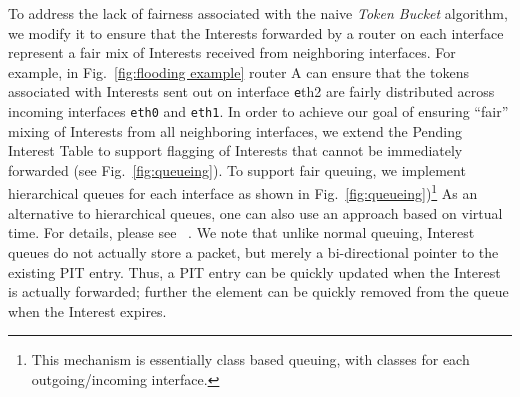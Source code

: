 

To address the lack of fairness associated with the naive {\it Token Bucket} algorithm, we modify it to ensure that the Interests forwarded by a router on each interface represent a fair mix of Interests received from neighboring interfaces. For example, in Fig.~\ref{fig:flooding example} router A can ensure that the tokens associated with Interests sent out on interface {\texttt eth2}  are fairly distributed across incoming interfaces \texttt{eth0} and \texttt{eth1}. 
In order to achieve our goal of ensuring ``fair'' mixing of Interests from all neighboring interfaces, 
we extend the Pending Interest Table to support flagging of Interests that cannot be immediately forwarded (see Fig.~\ref{fig:queueing}). To support fair queuing, we implement hierarchical queues for each interface as shown in Fig.~\ref{fig:queueing})\footnote{This mechanism is essentially class based queuing, with classes for each outgoing/incoming interface.} As an alternative to hierarchical queues, one can also use an approach based on virtual time. For details, please see ~\cite{zhang1990virtual}.  We note that unlike normal queuing, Interest queues do not actually store a packet, but merely a bi-directional pointer to the existing PIT entry.
Thus, a PIT entry can be quickly updated when the Interest is actually forwarded; further the element can be quickly removed from the queue when the Interest expires.


